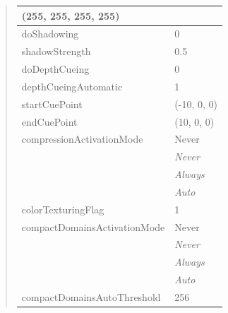 \documentclass[letterpaper,10pt,english]{sphinxmanual}
\begin{document}
\begin{quote}
\begin{longtable}{|l|l|}
(255, 255, 255, 255)
\\
\hline
doShadowing
 & 
0
\\
\hline
shadowStrength
 & 
0.5
\\
\hline
doDepthCueing
 & 
0
\\
\hline
depthCueingAutomatic
 & 
1
\\
\hline
startCuePoint
 & 
(-10, 0, 0)
\\
\hline
endCuePoint
 & 
(10, 0, 0)
\\
\hline
compressionActivationMode
 & 
Never
\\
\hline & 
\emph{Never}
\\
\hline & 
\emph{Always}
\\
\hline & 
\emph{Auto}
\\
\hline
colorTexturingFlag
 & 
1
\\
\hline
compactDomainsActivationMode
 & 
Never
\\
\hline & 
\emph{Never}
\\
\hline & 
\emph{Always}
\\
\hline & 
\emph{Auto}
\\
\hline
compactDomainsAutoThreshold
 & 
256
\\
\hline\end{longtable}

\end{quote}

\begin{DUlineblock}{0em}
\item[] 
\end{DUlineblock}

\begin{DUlineblock}{0em}
\item[] 
\end{DUlineblock}
\end{document}
